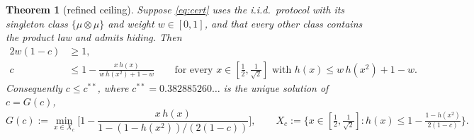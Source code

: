 \documentclass[11pt,a4paper]{article}
\newtheorem{theorem}{Theorem}[section]
\theoremstyle{definition}
\theoremstyle{remark}
\newcommand{\ent}{h}
\begin{document}
\begin{theorem}[refined ceiling]\label{thm:refined}
Suppose \eqref{eq:cert} uses the i.i.d.\ protocol with its singleton class $\{\mu\otimes\mu\}$ and weight $w\in[0,1]$, and that every other class contains the product law and admits hiding. Then
\begin{align}
2w(1-c)&\ge1,\label{eq:H}\\
c&\le1-\frac{x\,\ent(x)}{w\,\ent(x^2)+1-w}\qquad\text{for every }x\in[\tfrac12,\tfrac1{\sqrt2}]\text{ with }\ent(x)\le w\,\ent(x^2)+1-w.\label{eq:D}
\end{align}
Consequently $c\le c^{**}$, where $c^{**}=0.382885260\ldots$ is the unique solution of $c=G(c)$,
\begin{equation}\label{eq:G}
G(c):=\min_{x\in X_c}\Big[1-\frac{x\,\ent(x)}{1-(1-\ent(x^2))/(2(1-c))}\Big],\qquad X_c:=\Big\{x\in[\tfrac12,\tfrac1{\sqrt2}]:\ent(x)\le1-\tfrac{1-\ent(x^2)}{2(1-c)}\Big\}.
\end{equation}
\end{theorem}
\end{document}
